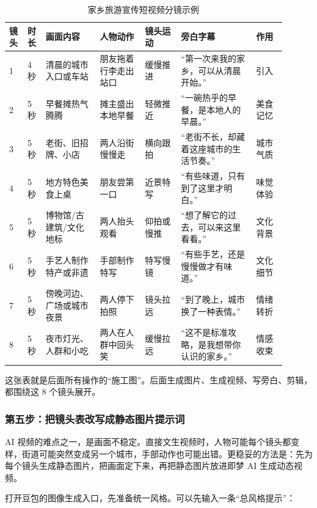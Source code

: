 \begin{table}[H]
\centering
\caption{家乡旅游宣传短视频分镜示例}
\label{tab:hometour-storyboard-example}
\begin{tabular}{p{0.05\linewidth} p{0.05\linewidth} p{0.18\linewidth} p{0.15\linewidth} p{0.12\linewidth} p{0.25\linewidth} p{0.10\linewidth}}
\toprule
\textbf{镜头} & \textbf{时长} & \textbf{画面内容} & \textbf{人物动作} & \textbf{镜头运动} & \textbf{旁白字幕} & \textbf{作用} \\
\midrule
1 & 4 秒 & 清晨的城市入口或车站 & 朋友拖着行李走出站口 & 缓慢推进 & “第一次来我的家乡，可以从清晨开始。” & 引入 \\
2 & 5 秒 & 早餐摊热气腾腾 & 摊主盛出本地早餐 & 轻微推近 & “一碗热乎的早餐，是本地人的早晨。” & 美食记忆 \\
3 & 5 秒 & 老街、旧招牌、小店 & 两人沿街慢慢走 & 横向跟拍 & “老街不长，却藏着这座城市的生活节奏。” & 城市气质 \\
4 & 5 秒 & 地方特色美食上桌 & 朋友尝第一口 & 近景特写 & “有些味道，只有到了这里才明白。” & 味觉体验 \\
5 & 5 秒 & 博物馆/古建筑/文化地标 & 两人抬头观看 & 仰拍或慢推 & “想了解它的过去，可以来这里看看。” & 文化背景 \\
6 & 5 秒 & 手艺人制作特产或非遗 & 手部制作特写 & 特写慢镜 & “有些手艺，还是慢慢做才有味道。” & 文化细节 \\
7 & 5 秒 & 傍晚河边、广场或城市夜景 & 两人停下拍照 & 镜头拉远 & “到了晚上，城市换了一种表情。” & 情绪转折 \\
8 & 5 秒 & 夜市灯光、人群和小吃 & 两人在人群中回头笑 & 缓慢拉远 & “这不是标准攻略，是我想带你认识的家乡。” & 情感收束 \\
\bottomrule
\end{tabular}
\end{table}

这张表就是后面所有操作的“施工图”。后面生成图片、生成视频、写旁白、剪辑，都围绕这 8 个镜头展开。

\subsubsection*{第五步：把镜头表改写成静态图片提示词}

AI 视频的难点之一，是画面不稳定。直接文生视频时，人物可能每个镜头都变样，街道可能突然变成另一个城市，手部动作也可能出错。更稳妥的方法是：先为每个镜头生成静态图片，把画面定下来，再把静态图片放进即梦 AI 生成动态视频。

打开豆包的图像生成入口，先准备统一风格。可以先输入一条“总风格提示”：

